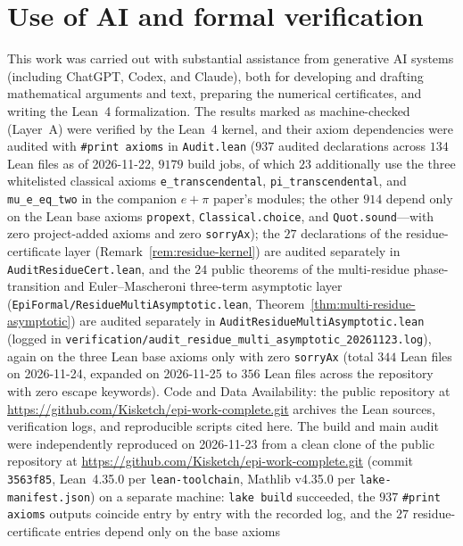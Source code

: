\documentclass[11pt]{article}
\theoremstyle{definition}
\theoremstyle{remark}
\begin{document}
\section*{Use of AI and formal verification}
This work was carried out with substantial assistance from generative AI
systems (including ChatGPT, Codex, and Claude), both for developing and drafting
mathematical arguments and text, preparing the numerical certificates, and
writing the Lean~4 formalization. The results marked as machine-checked (Layer~A)
were verified by the Lean~4 kernel, and their axiom dependencies were audited
with \texttt{\#print axioms} in \texttt{Audit.lean} ($937$ audited declarations
across $134$ Lean files as of 2026-11-22, $9179$ build jobs, of which $23$ additionally use the three whitelisted classical
axioms \texttt{e\_transcendental}, \texttt{pi\_transcendental}, and
\texttt{mu\_e\_eq\_two} in the companion $e+\pi$ paper's modules; the other $914$
depend only on the Lean base axioms \texttt{propext}, \texttt{Classical.choice},
and \texttt{Quot.sound}---with zero
project-added axioms and zero \texttt{sorryAx}); the $27$ declarations of the
residue-certificate layer (Remark~\ref{rem:residue-kernel}) are audited separately in
\texttt{AuditResidueCert.lean}, and the $24$ public theorems of the multi-residue
phase-transition and Euler--Mascheroni three-term asymptotic layer
(\texttt{EpiFormal/\allowbreak ResidueMultiAsymptotic.lean},
Theorem~\ref{thm:multi-residue-asymptotic}) are audited separately in
\texttt{AuditResidueMultiAsymptotic.lean} (logged in
\texttt{verification/\allowbreak audit\_\allowbreak residue\_\allowbreak multi\_\allowbreak asymptotic\_\allowbreak 20261123.log}),
again on the three Lean base axioms only with zero \texttt{sorryAx} (total $344$ Lean files on 2026-11-24, expanded on 2026-11-25 to $356$ Lean files across the repository with zero escape keywords). Code and Data Availability: the public repository at \url{https://github.com/Kisketch/epi-work-complete.git} archives the Lean sources, verification logs, and reproducible scripts cited here. The build and main audit were independently reproduced on 2026-11-23 from a clean clone of the public repository at \url{https://github.com/Kisketch/epi-work-complete.git} (commit \texttt{3563f85}, Lean~4.35.0 per \texttt{lean-toolchain}, Mathlib v4.35.0 per \texttt{lake-manifest.json}) on a separate machine: \texttt{lake build} succeeded, the $937$
\texttt{\#print axioms} outputs coincide entry by entry with the recorded log, and the $27$ residue-certificate entries depend only on the base axioms
\end{document}
